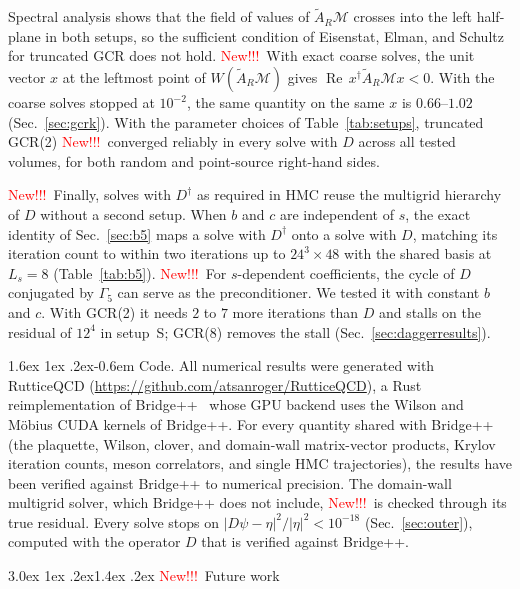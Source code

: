 \documentclass[11pt,a4paper]{article}
\makeatletter
\newif\ifshownew \shownewtrue
\DeclareRobustCommand\New{\ifshownew\textcolor{red}{New!!!}\ \else\ignorespaces\fi}
\renewcommand\section{\@startsection{section}{1}{\z@}%
  {3.0ex \@plus 1ex \@minus .2ex}{1.4ex \@plus .2ex}%
  {\centering\normalfont\normalsize\bfseries}}
\renewcommand\paragraph{\@startsection{paragraph}{4}{\z@}%
  {1.6ex \@plus 1ex \@minus .2ex}{-0.6em}%
  {\normalfont\normalsize\itshape}}
\newcommand\FloatBarrier{\par\begingroup\let\@elt\relax
  \edef\@tempa{\@botlist\@deferlist\@dbldeferlist}%
  \ifx\@tempa\@empty\else\clearpage\fi\endgroup}
\let\origsection\section
\renewcommand\section{\FloatBarrier\origsection}
\numberwithin{equation}{section}
\newcommand{\dg}{^{\dagger}}
\newcommand{\Gfive}{\Gamma_5}
\newcommand{\AR}{\tilde A_{R}}
\renewcommand{\Re}{\operatorname{Re}}
\makeatother
\begin{document}
Spectral analysis shows that the field of values of $\AR\mathcal M$ crosses into the left
half-plane in both setups, so the sufficient condition of Eisenstat, Elman, and Schultz~\cite{ESS}
for truncated GCR does not hold. \New With exact coarse solves,
the unit vector $x$ at the leftmost point of $W(\AR\mathcal M)$ gives $\Re\,x\dg\AR\mathcal Mx<0$.
With the coarse solves stopped at $10^{-2}$, the same quantity on the same $x$ is $0.66$--$1.02$
(Sec.~\ref{sec:gcrk}). With the parameter choices of Table~\ref{tab:setups}, truncated GCR(2)
\New converged reliably in every solve with $D$ across all tested volumes, for
both random and point-source right-hand sides.

\New Finally, solves with $D\dg$ as required in HMC reuse the multigrid
hierarchy of $D$ without a second setup. When $b$ and $c$ are independent of $s$, the exact
identity of Sec.~\ref{sec:b5} maps a solve with $D\dg$ onto a solve with $D$, matching its
iteration count to within two iterations up to $24^3\times48$ with the shared basis at
$L_s=8$ (Table~\ref{tab:b5}). \New For
$s$-dependent coefficients, the cycle of $D$ conjugated by $\Gfive$ can serve as the preconditioner.
We tested it with constant $b$ and $c$. With GCR(2) it needs $2$ to $7$ more iterations than $D$
and stalls on the residual of $12^4$ in setup~S; GCR(8) removes the stall (Sec.~\ref{sec:daggerresults}).

\paragraph{Code.} All numerical results were generated with RutticeQCD
(\url{https://github.com/atsanroger/RutticeQCD}), a Rust reimplementation of
Bridge++~\cite{BridgeUeda,Bridge} whose GPU backend uses the Wilson and M\"obius CUDA kernels of
Bridge++. For every quantity shared with Bridge++ (the plaquette, Wilson, clover, and domain-wall
matrix-vector products, Krylov iteration counts, meson correlators, and single HMC trajectories),
the results have been verified against Bridge++ to numerical precision. The domain-wall multigrid
solver, which Bridge++ does not include, \New is checked through its true residual. Every solve stops
on $|D\psi-\eta|^2/|\eta|^2<10^{-18}$ (Sec.~\ref{sec:outer}), computed with the operator $D$ that is
verified against Bridge++.
\fi
\section{\New Future work}
\label{sec:open}
\end{document}
